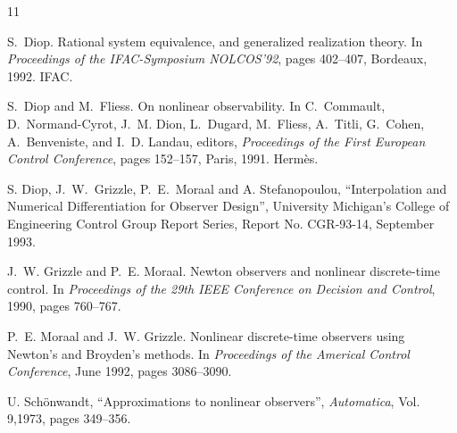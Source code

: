 \begin{thebibliography}{11}

\small
{}
S.~Diop.
\newblock Rational system equivalence, and generalized realization theory.
\newblock In {\em Proceedings of the {I}FAC-{S}ymposium {N}OLCOS'92}, pages
  402--407, Bordeaux, 1992. IFAC.

S.~Diop and M.~Fliess.
\newblock On nonlinear observability.
\newblock In C.~Commault, D.~Normand-Cyrot, J.~M. Dion, L.~Dugard, M.~Fliess,
  A.~Titli, G.~Cohen, A.~Benveniste, and I.~D. Landau, editors, {\em
  Proceedings of the {F}irst {E}uropean {C}ontrol {C}onference}, pages
  152--157, Paris, 1991. Herm{\`e}s.

S. Diop, J.\ W.\ Grizzle, 
P.\ E.\ Moraal and A. Stefanopoulou, ``Interpolation and Numerical 
Differentiation for Observer Design'', University Michigan's College of
Engineering Control Group Report Series,  Report No. CGR-93-14, September
1993.


J.~W. Grizzle and P.~E. Moraal.
\newblock Newton observers and nonlinear discrete-time control.
\newblock In {\em Proceedings of the 29th {I}EEE {C}onference on {D}ecision and
  {C}ontrol}, 1990, pages 760--767.

P.~E. Moraal and J.~W. Grizzle.
\newblock Nonlinear discrete-time observers using {N}ewton's and {B}royden's
  methods.
\newblock In {\em Proceedings of the {A}merical {C}ontrol {C}onference}, June
1992, pages 3086--3090.

U. Sch\"{o}nwandt, ``Approximations to nonlinear observers'', {\it Automatica},
Vol. 9,1973,  pages 349--356.

\end{thebibliography}







